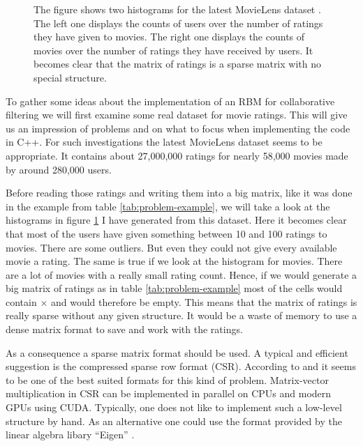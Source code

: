 \documentclass[crop=false,10pt]{standalone}
\begin{document}
\begin{figure}
\begin{subfigure}[b]{0.49\textwidth}
      \end{subfigure}
      \caption{%
        The figure shows two histograms for the latest MovieLens dataset \cite{MovieLensDataset}.
        The left one displays the counts of users over the number of ratings they have given to movies.
        The right one displays the counts of movies over the number of ratings they have received by users.
        It becomes clear that the matrix of ratings is a sparse matrix with no special structure.
      }
      \label{fig:rating-histograms}
    \end{figure}

    To gather some ideas about the implementation of an RBM for collaborative filtering we will first examine some real dataset for movie ratings.
    This will give us an impression of problems and on what to focus when implementing the code in C++.
    For such investigations the latest MovieLens dataset \cite{MovieLensDataset} seems to be appropriate.
    It contains about 27,000,000 ratings for nearly 58,000 movies made by around 280,000 users.

    Before reading those ratings and writing them into a big matrix, like it was done in the example from table \ref{tab:problem-example}, we will take a look at the histograms in figure \ref{fig:rating-histograms} I have generated from this dataset.
    Here it becomes clear that most of the users have given something between 10 and 100 ratings to movies.
    There are some outliers.
    But even they could not give every available movie a rating.
    The same is true if we look at the histogram for movies.
    There are a lot of movies with a really small rating count.
    Hence, if we would generate a big matrix of ratings as in table \ref{tab:problem-example} most of the cells would contain $\times$ and would therefore be empty.
    This means that the matrix of ratings is really sparse without any given structure.
    It would be a waste of memory to use a dense matrix format to save and work with the ratings.

    As a consequence a sparse matrix format should be used.
    A typical and efficient suggestion is the compressed sparse row format (CSR).
    According to \cite{Bell2008} and \cite{Bell2009} it seems to be one of the best suited formats for this kind of problem.
    Matrix-vector multiplication in CSR can be implemented in parallel on CPUs and modern GPUs using CUDA.
    Typically, one does not like to implement such a low-level structure by hand.
    As an alternative one could use the format provided by the linear algebra libary \enquote{Eigen} \cite{eigen2018}.
    \cite{Bell2008,Bell2009}
\end{document}
